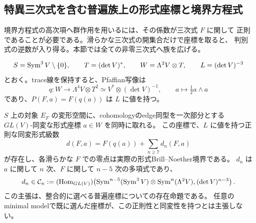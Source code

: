 \subsection{特異三次式を含む普遍族上の形式座標と境界方程式}
\label{subsec:universal-bn-equation}

境界方程式の高次項へ群作用を用いるには、その係数が三次式 $F$ に関して
正則であることが必要である。滑らかな三次式の開集合だけで座標を取ると、
判別式の逆数が入り得る。本節では全ての非零三次式へ族を広げる。

\[
 S=\operatorname{Sym}^3V\setminus\{0\},\qquad
 T=(\det V)^*,\qquad W=\Lambda^2V\otimes T,
 \qquad L=(\det V)^{-3}
\]
とおく。trace線を保持すると、Pfaffian写像は
\[
 q:W\longrightarrow\Lambda^4V\otimes T^2
       \simeq V^*\otimes(\det V)^{-1},
 \qquad a\longmapsto\tfrac12a\wedge a
\]
であり、$P(F,a)=F(q(a))$ は $L$ に値を持つ。

\begin{theorem}[正則で同変な普遍境界方程式]
\label{thm:universal-bn-equation}
$S$ 上の対象 $E_F$ の変形空間に、cohomologyのedge同型を一次部分とする
$GL(V)$-同変な形式座標 $a\in W$ を同時に取れる。
この座標で、$L$ に値を持つ正則な同変形式級数
\begin{equation}\label{eq:universal-bn-series}
 d(F,a)=F(q(a))+\sum_{n\ge7}d_n(F,a)
\end{equation}
が存在し、各滑らかな $F$ での零点は実際の形式Brill--Noether境界である。
$d_n$ は $a$ に関して $n$ 次、$F$ に関して $n-5$ 次の多項式であり、
\begin{equation}\label{eq:universal-bn-covariants}
 d_n\in\mathcal C_n:=(\operatorname{Hom}_{GL(V)})\!\left(
 \operatorname{Sym}^{n-5}(\operatorname{Sym}^3V)\otimes\operatorname{Sym}^n(\Lambda^2V),
 (\det V)^{n-3}\right).
\end{equation}
この主張は、整合的に選べる普遍座標についての存在命題である。
任意のminimal modelで既に選んだ座標が、この正則性と同変性を持つとは主張しない。
\end{theorem}

